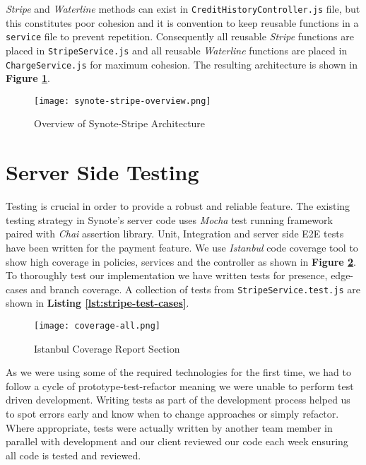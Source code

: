 \textit{Stripe} and \textit{Waterline} methods can exist in \texttt{CreditHistoryController.js} file, but this constitutes poor cohesion and it is convention to keep reusable functions in a \texttt{service} file to prevent repetition. Consequently all reusable \textit{Stripe} functions are placed in \texttt{StripeService.js} and all reusable \textit{Waterline} functions are placed in \texttt{ChargeService.js} for maximum cohesion. The resulting  architecture is shown in \textbf{Figure \ref{fig:synote-stripe}}.\\

\begin{figure}[!hbt]
  \centering
 	\texttt{[image: synote-stripe-overview.png]}
  \caption{Overview of Synote-Stripe Architecture}
 	\label{fig:synote-stripe}
\end{figure}

\section{Server Side Testing}
\label{sec:server-side-testing}

Testing is crucial in order to provide a robust and reliable feature. The existing testing strategy in Synote's server code uses \textit{Mocha} \cite{mocha} test running framework paired with \textit{Chai} \cite{chai} assertion library. Unit, Integration and server side E2E tests have been written for the payment feature. We use \textit{Istanbul} \cite{istanbul} code coverage tool to show high coverage in policies, services and the controller as shown in \textbf{Figure \ref{fig:coverage}}. To thoroughly test our implementation we have written tests for presence, edge-cases and branch coverage. A collection of tests from \texttt{StripeService.test.js} are shown in \textbf{Listing \ref{lst:stripe-test-cases}}.\\

\begin{figure}[!hbt]
  \centering
 	\texttt{[image: coverage-all.png]}
  \caption{Istanbul Coverage Report Section}
 	\label{fig:coverage}
\end{figure}

As we were using some of the required technologies for the first time, we had to follow a cycle of prototype-test-refactor meaning we were unable to perform test driven development. Writing tests as part of the development process helped us to spot errors early and know when to change approaches or simply refactor. Where appropriate, tests were actually written by another team member in parallel with development and our client reviewed our code each week ensuring all code is tested and reviewed.\\

